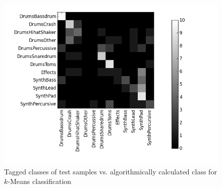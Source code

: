 \begin{figure}[htbp]
\centering
\includegraphics[width=0.45\linewidth]{../plots/knn.png}
\caption{Tagged classes of test samples vs. algorithmically calculated class for $k$-Means classification}
\label{fig:k-NN}
\end{figure}
